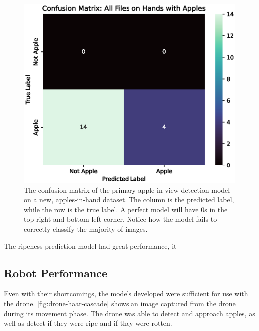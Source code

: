 \begin{figure}[!htb]
    \centering
    \includegraphics[width=\columnwidth,keepaspectratio]
    {./figures/confusion_matrix_All_Files_on_Hands_with_Apples}
    \caption{
        The confusion matrix of the primary apple-in-view detection model on a new, apples-in-hand dataset.
        The column is the predicted label, while the row is the true label.
        A perfect model will have 0s in the top-right and bottom-left corner.
        Notice how the model fails to correctly classify the majority of images.
    }
    \label{fig:apple-in-hand-confusion-matrix}
\end{figure}

The ripeness prediction model had great performance, it 

\subsection{Robot Performance}\label{subsec:robot-performance}
Even with their shortcomings, the models developed were sufficient for use with the drone.
\autoref{fig:drone-haar-cascade} shows an image captured from the drone during its movement phase.
The drone was able to detect and approach apples, as well as detect if they were ripe and if they were rotten.

